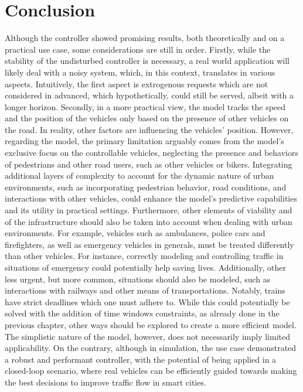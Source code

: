 \section{Conclusion}
Although the controller showed promising results, both theoretically and on a practical use case, some considerations are still in order. Firstly, while the stability of the undisturbed controller is necessary, a real world application will likely deal with a noisy system, which, in this context, translates in various aspects. Intuitively, the first aspect is extrogenous requests which are not considered in advanced, which hypothetically, could still be served, albeit with a longer horizon. Secondly, in a more practical view, the model tracks the speed and the position of the vehicles only based on the presence of other vehicles on the road. In reality, other factors are influencing the vehicles' position. However, regarding the model, the primary limitation arguably comes from the model's exclusive focus on the controllable vehicles, neglecting the presence and behaviors of pedestrians and other road users, such as other vehicles or bikers. Integrating additional layers of complexity to account for the dynamic nature of urban environments, such as incorporating pedestrian behavior, road conditions, and interactions with other vehicles, could enhance the model's predictive capabilities and its utility in practical settings. Furthermore, other elements of viability and of the infrastructure should also be taken into account when dealing with urban environments. For example, vehicles such as ambulances, police cars and firefighters, as well as emergency vehicles in generals, must be treated differently than other vehicles. For instance, correctly modeling and controlling traffic in situations of emergency could potentially help saving lives. Additionally, other less urgent, but more common, situations should also be modeled, such as interactions with railways and other means of transportations. Notably, trains have strict deadlines which one must adhere to. While this could potentially be solved with the addition of time windows constraints, as already done in the previous chapter, other ways should be explored to create a more efficient model. \\
The simplistic nature of the model, however, does not necessarily imply limited applicability. On the contrary, although in simulation, the use case demonstrated a robust and performant controller, with the potential of being applied in a closed-loop scenario, where real vehicles can be efficiently guided towards making the best decisions to improve traffic flow in smart cities. 